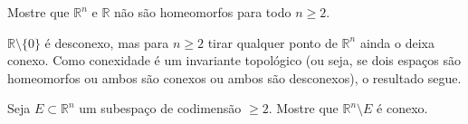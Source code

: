 \begin{Mybox}
Mostre que $\mathbb{R}^n$ e $\mathbb{R}$ não são homeomorfos para todo $n \geq 2$.
\vspace{-.4cm}
\end{Mybox}
\vspace{-.5cm}
\begin{dem}
 $\mathbb{R} \setminus \{0\}$ é desconexo, mas para $n \geq 2$ tirar qualquer ponto de $\mathbb{R}^n$ ainda o deixa conexo. Como conexidade é um invariante topológico (ou seja, se dois espaços são homeomorfos ou ambos são conexos ou ambos são desconexos), o resultado segue.
\end{dem}

\begin{Mybox}
Seja $E \subset \mathbb{R}^n$ um subespaço de codimensão $\geq 2$. Mostre que $\mathbb{R}^n \setminus E$ é conexo.
\vspace{-.4cm}
\end{Mybox}
\vspace{-.5cm}
